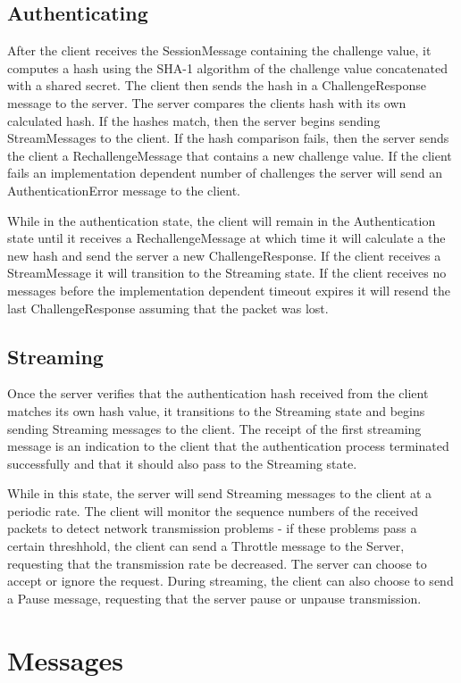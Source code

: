 \documentclass[12pt,letterpaper,titlepage]{article}
\begin{document}
\subsection{Authenticating}
After the client receives the SessionMessage containing the challenge value, it computes
a hash using the SHA-1 algorithm of the challenge value concatenated with a shared secret. The
client then sends the hash in a ChallengeResponse message to the server. The server compares
the clients hash with its own calculated hash. If the hashes match, then the server begins sending
StreamMessages to the client. If the hash comparison fails, then the server sends the client a
RechallengeMessage that contains a new challenge value. If the client fails an implementation
dependent number of challenges the server will send an AuthenticationError message to the client.

While in the authentication state, the client will remain in the Authentication state until it receives
a RechallengeMessage at which time it will calculate a the new hash and send the 
server a new ChallengeResponse. If the client receives a StreamMessage it will transition to 
the Streaming state. If the client receives no messages before the implementation dependent
timeout expires it will resend the last ChallengeResponse assuming that the packet was lost.

\subsection{Streaming}
Once the server verifies that the authentication hash received from the client matches its own hash value, 
it transitions to the Streaming state and begins sending Streaming messages to the client.  The receipt of 
the first streaming message is an indication to the client that the authentication process terminated 
successfully and that it should also pass to the Streaming state.  

While in this state, the server will send Streaming messages to the client at a periodic rate.  The client
will monitor the sequence numbers of the received packets to detect network transmission problems - if 
these problems pass a certain threshhold, the client can send a Throttle message to the Server, 
requesting that the transmission rate be decreased.  The server can choose to accept or ignore the 
request.  During streaming, the client can also choose to send a Pause message, requesting that the
server pause or unpause transmission.


\section{Messages}
\end{document}
